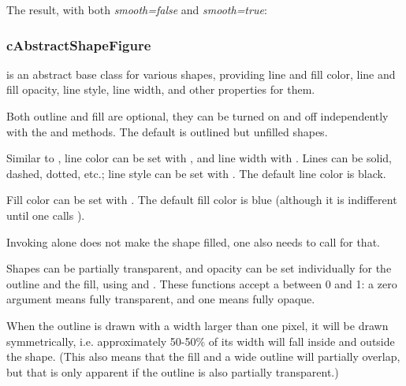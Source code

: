 
The result, with both \textit{smooth=false} and \textit{smooth=true}:

\begin{center}

\end{center}


\subsubsection{cAbstractShapeFigure}
\label{sec:graphics:abstractshapefigure}

 is an abstract base class for various shapes,
providing line and fill color, line and fill opacity, line style, line
width, and other properties for them.

Both outline and fill are optional, they can be turned on and off
independently with the  and 
methods. The default is outlined but unfilled shapes.

Similar to , line color can be set with
, and line width with .
Lines can be solid, dashed, dotted, etc.; line style can be set with
. The default line color is black.

Fill color can be set with . The default fill color
is blue (although it is indifferent until one calls ).

\begin{note}
Invoking  alone does not make the shape filled,
one also needs to call  for that.
\end{note}

Shapes can be partially transparent, and opacity can be set individually
for the outline and the fill, using  and
. These functions accept a  between 0
and 1: a zero argument means fully transparent, and one means fully opaque.

When the outline is drawn with a width larger than one pixel, it will be
drawn symmetrically, i.e. approximately 50-50\% of its width will fall
inside and outside the shape. (This also means that the fill and a wide
outline will partially overlap, but that is only apparent if the
outline is also partially transparent.)

